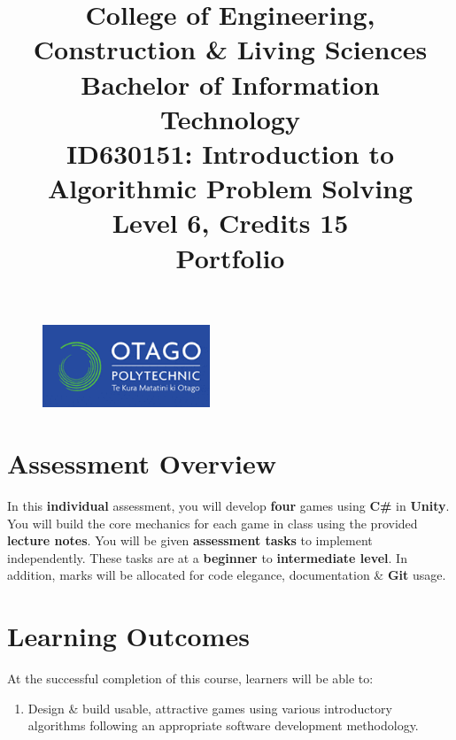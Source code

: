\documentclass{article}
\author{}
\begin{document}
\begin{figure}
	\centering
	\includegraphics[width=50mm]{../../resources/img/logo.png}
\end{figure}

\title{College of Engineering, Construction \& Living Sciences\\Bachelor of Information Technology\\ID630151: Introduction to Algorithmic Problem Solving\\Level 6, Credits 15\\\textbf{Portfolio}}
\date{}
\maketitle

\section*{Assessment Overview}
In this \textbf{individual} assessment, you will develop \textbf{four} games using \textbf{C\#} in \textbf{Unity}. You will build the core mechanics for each game in class using the provided \textbf{lecture notes}. You will be given \textbf{assessment tasks} to implement independently. These tasks are at a \textbf{beginner} to \textbf{intermediate level}. In addition, marks will be allocated for code elegance, documentation \& \textbf{Git} usage.

\section*{Learning Outcomes}
At the successful completion of this course, learners will be able to:
\begin{enumerate}
	\item Design \& build usable, attractive games using various introductory algorithms following an appropriate software development methodology.
\end{enumerate}
\end{document}
